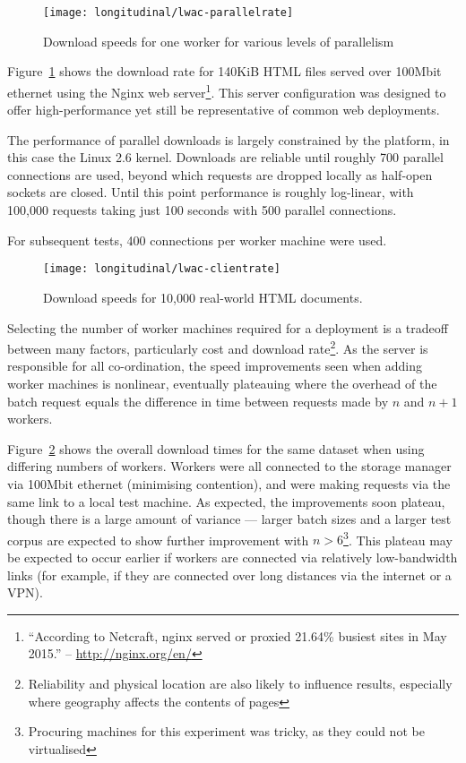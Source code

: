 \begin{figure}[Ht]
    \centering
    \texttt{[image: longitudinal/lwac-parallelrate]}
    \caption{Download speeds for one worker for various levels of parallelism}
    \label{fig:longitudinal:lwac:parallelrate}
\end{figure}

Figure~\ref{fig:longitudinal:lwac:parallelrate} shows the download rate for 140KiB HTML files served over 100Mbit ethernet using the Nginx web server\footnote{``According to Netcraft, nginx served or proxied 21.64\% busiest sites in May 2015.'' -- \url{http://nginx.org/en/}}.  This server configuration was designed to offer high-performance yet still be representative of common web deployments.

The performance of parallel downloads is largely constrained by the platform, in this case the Linux 2.6 kernel.  Downloads are reliable until roughly 700 parallel connections are used, beyond which requests are dropped locally as half-open sockets are closed.  Until this point performance is roughly log-linear, with 100,000 requests taking just 100 seconds with 500 parallel connections.

For subsequent tests, 400 connections per worker machine were used.


\begin{figure}[Ht]
    \centering
    \texttt{[image: longitudinal/lwac-clientrate]}
    \caption{Download speeds for 10,000 real-world HTML documents.}
    \label{fig:longitudinal:lwac:numclients}
\end{figure}


Selecting the number of worker machines required for a deployment is a tradeoff between many factors, particularly cost and download rate\footnote{Reliability and physical location are also likely to influence results, especially where geography affects the contents of pages}.  As the server is responsible for all co-ordination, the speed improvements seen when adding worker machines is nonlinear, eventually plateauing where the overhead of the batch request equals the difference in time between requests made by $n$ and $n + 1$ workers.

Figure~\ref{fig:longitudinal:lwac:numclients} shows the overall download times for the same dataset when using differing numbers of workers.  Workers were all connected to the storage manager via 100Mbit ethernet (minimising contention), and were making requests via the same link to a local test machine.  As expected, the improvements soon plateau, though there is a large amount of variance --- larger batch sizes and a larger test corpus are expected to show further improvement with $n > 6$\footnote{Procuring machines for this experiment was tricky, as they could not be virtualised}.  This plateau may be expected to occur earlier if workers are connected via relatively low-bandwidth links (for example, if they are connected over long distances via the internet or a VPN).






